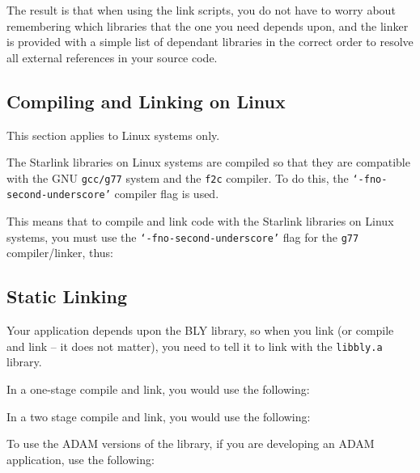 \documentclass[twoside,11pt,nolof]{starlink}
\begin{document}
The result is that when using the link scripts, you do not have to worry
about remembering which libraries that the one you need depends upon, and
the linker is provided with a simple list of dependant libraries in the
correct order to resolve all external references in your source code.

\subsection{Compiling and Linking on Linux}
\label{compiling_and_linking_on_liunux}

This section applies to Linux systems only.

The Starlink libraries on Linux systems are compiled so that they are
compatible with the GNU \texttt{gcc/g77} system and the \texttt{f2c}
compiler.  To do this, the \texttt{`-fno-second-underscore'} compiler
flag is used.

This means that to compile and link code with the Starlink libraries
on Linux systems, you must use the \texttt{`-fno-second-underscore'}
flag for the \texttt{g77} compiler/linker, thus:

\begin{terminalv}
\end{terminalv}

\subsection{Static Linking}
\label{static_linking}

Your application depends upon the BLY library, so when you link (or
compile and link -- it does not matter), you need to tell it to link with
the \texttt{libbly.a} library.

In a one-stage compile and link, you would use the following:

\begin{terminalv}
\end{terminalv}

In a two stage compile and link, you would use the following:

\begin{terminalv}
\end{terminalv}

To use the ADAM versions of the library, if you are developing an ADAM
application, use the following:
\end{document}

